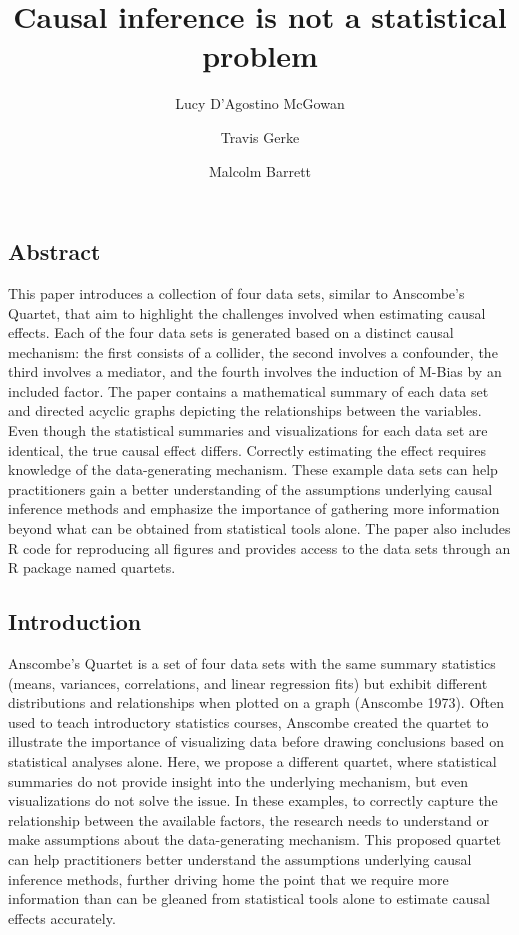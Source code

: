\documentclass[
  letterpaper,
  DIV=11,
  numbers=noendperiod]{scrartcl}
\title{Causal inference is not a statistical problem}
\author{Lucy D'Agostino McGowan \and Travis Gerke \and Malcolm Barrett}
\date{}
\begin{document}
\maketitle
\ifdefined\Shaded\renewenvironment{Shaded}{\begin{tcolorbox}[enhanced, borderline west={3pt}{0pt}{shadecolor}, breakable, sharp corners, interior hidden, frame hidden, boxrule=0pt]}{\end{tcolorbox}}\fi

\hypertarget{abstract}{%
\subsection{Abstract}\label{abstract}}

This paper introduces a collection of four data sets, similar to
Anscombe's Quartet, that aim to highlight the challenges involved when
estimating causal effects. Each of the four data sets is generated based
on a distinct causal mechanism: the first consists of a collider, the
second involves a confounder, the third involves a mediator, and the
fourth involves the induction of M-Bias by an included factor. The paper
contains a mathematical summary of each data set and directed acyclic
graphs depicting the relationships between the variables. Even though
the statistical summaries and visualizations for each data set are
identical, the true causal effect differs. Correctly estimating the
effect requires knowledge of the data-generating mechanism. These
example data sets can help practitioners gain a better understanding of
the assumptions underlying causal inference methods and emphasize the
importance of gathering more information beyond what can be obtained
from statistical tools alone. The paper also includes R code for
reproducing all figures and provides access to the data sets through an
R package named quartets.

\hypertarget{introduction}{%
\subsection{Introduction}\label{introduction}}

Anscombe's Quartet is a set of four data sets with the same summary
statistics (means, variances, correlations, and linear regression fits)
but exhibit different distributions and relationships when plotted on a
graph (Anscombe 1973). Often used to teach introductory statistics
courses, Anscombe created the quartet to illustrate the importance of
visualizing data before drawing conclusions based on statistical
analyses alone. Here, we propose a different quartet, where statistical
summaries do not provide insight into the underlying mechanism, but even
visualizations do not solve the issue. In these examples, to correctly
capture the relationship between the available factors, the research
needs to understand or make assumptions about the data-generating
mechanism. This proposed quartet can help practitioners better
understand the assumptions underlying causal inference methods, further
driving home the point that we require more information than can be
gleaned from statistical tools alone to estimate causal effects
accurately.
\end{document}
